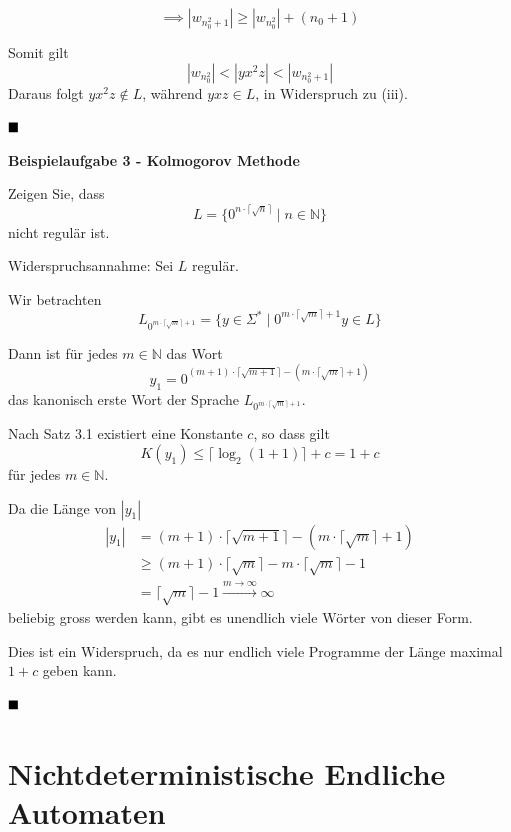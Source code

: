 \documentclass[a4paper, 11pt]{article}
\def\N{\mathbb{N}}
\newcommand\myTitle[1]{{\large \textbf {#1}}}
\begin{document}
    $$\implies |w_{n_0^2+1}| \geq |w_{n_0^2}| + (n_0 + 1)$$

    Somit gilt 
    $$|w_{n_0^2}| < |yx^2z| < |w_{n_0^2+1}|$$
    Daraus folgt $yx^2z \notin L$, während $yxz \in L$, in Widerspruch zu (iii).

    $\hfill\blacksquare$



    \myTitle{Beispielaufgabe 3 - Kolmogorov Methode}

    Zeigen Sie, dass 
    $$L = \{0^{n\cdot \lceil \sqrt{n}\rceil} \mid n \in \N\}$$ 
    nicht regulär ist.

    Widerspruchsannahme: Sei $L$ regulär.

   Wir betrachten $$L_{0^{m\cdot \lceil \sqrt{m}\rceil + 1}} = \{y \in \Sigma^* \mid 0^{m\cdot \lceil \sqrt{m}\rceil + 1}y \in L\}$$

   Dann ist für jedes $m \in \N$ das Wort $$y_1 = 0^{(m+1)\cdot \lceil \sqrt{m+1}\rceil - (m\cdot \lceil \sqrt{m}\rceil + 1)}$$
   das kanonisch erste Wort der Sprache $L_{0^{m\cdot \lceil \sqrt{m}\rceil + 1}}$.

    Nach Satz 3.1 existiert eine Konstante $c$, so dass gilt
    $$K(y_1) \leq \lceil\log_2(1+1)\rceil + c = 1 + c$$
    für jedes $m \in \N$.

    Da die Länge von $|y_1|$
    \begin{align*}
        |y_1| &= (m+1)\cdot \lceil \sqrt{m+1}\rceil - (m\cdot \lceil \sqrt{m}\rceil + 1)\\
             &\geq (m+1) \cdot  \lceil \sqrt{m}\rceil -m\cdot \lceil \sqrt{m}\rceil -1\\
             &= \lceil \sqrt{m}\rceil -1 \overset{m \to \infty}{\longrightarrow} \infty
    \end{align*}
    beliebig gross werden kann, gibt es unendlich viele Wörter von dieser Form.

    Dies ist ein Widerspruch, da es nur endlich viele Programme der Länge maximal $1+c$ geben kann.

    $\hfill\blacksquare$


\section{Nichtdeterministische Endliche Automaten}
\end{document}
